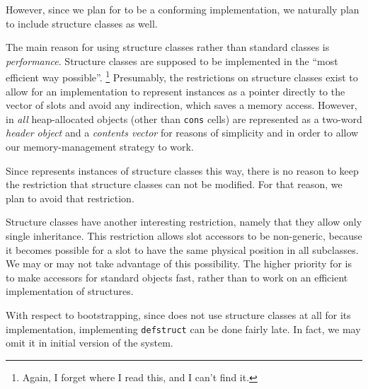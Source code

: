 However, since we plan for \sysname{} to be a conforming
implementation, we naturally plan to include structure classes as
well. 

The main reason for using structure classes rather than standard
classes is \emph{performance}.  Structure classes are supposed to be
implemented in the ``most efficient way possible''.%
\footnote{Again, I forget where I read this, and I can't find it.}
Presumably, the restrictions on structure classes exist to allow for
an implementation to represent instances as a pointer directly to the
vector of slots and avoid any indirection, which saves a memory
access.  However, in \sysname{} \emph{all} heap-allocated objects
(other than \texttt{cons} cells) are represented as a two-word
\emph{header object} and a \emph{contents vector} for reasons of
simplicity and in order to allow our memory-management strategy to
work.

Since \sysname{} represents instances of structure classes this way,
there is no reason to keep the restriction that structure classes can
not be modified.  For that reason, we plan to avoid that restriction.

Structure classes have another interesting restriction, namely that
they allow only single inheritance.  This restriction allows slot
accessors to be non-generic, because it becomes possible for a slot to
have the same physical position in all subclasses.  We may or may not
take advantage of this possibility.  The higher priority for
\sysname{} is to make accessors for standard objects fast, rather than
to work on an efficient implementation of structures. 

With respect to bootstrapping, since \sysname{} does not use structure
classes at all for its implementation, implementing \texttt{defstruct}
can be done fairly late.  In fact, we may omit it in initial version
of the system. 
